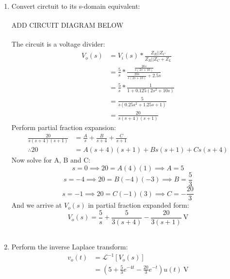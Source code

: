 \begin{enumerate}
	\item{
		Convert circtuit to its s-domain equivalent:
		\\ \\
		ADD CIRCUIT DIAGRAM BELOW
		\\ \\
		The circuit is a voltage divider:
		\begin{align*}
			V_o(s) &= V_i(s) * \frac{Z_R || Z_C}{Z_R || Z_C + Z_L} \\
			&= \frac{5}{s} * \frac{\frac{20s}{s(2s+10)}}{\frac{20s}{s(2s+10)}+2.5s} \\
			&= \frac{5}{s} * \frac{1}{1+0.125(2s^2+10s)} \\
			&= \frac{5}{s(0.25s^2+1.25s+1)} \\
			&= \frac{20}{s(s+4)(s+1)}
		\end{align*}
		Perform partial fraction expansion:
		\begin{align*}
			\frac{20}{s(s+4)(s+1)} &= \frac{A}{s} + \frac{B}{s+4} + \frac{C}{s+1} \\
			\therefore 20 &= A(s+4)(s+1) + Bs(s+1) + Cs(s+4)
		\end{align*}
		Now solve for A, B and C:
		\begin{equation*}
			s = 0 \implies 20 = A(4)(1) \implies A = 5
		\end{equation*}
		\begin{equation*}
			s = -4 \implies 20 = B(-4)(-3) \implies B = \frac{5}{3}
		\end{equation*}
		\begin{equation*}
			s = -1 \implies 20 = C(-1)(3) \implies C = -\frac{20}{3}
		\end{equation*}
		And we arrive at $V_o(s)$ in partial fraction expanded form:
		\begin{equation*}
			V_o(s) = \frac{5}{s} + \frac{5}{3(s+4)} - \frac{20}{3(s+1)} \ \mathrm{V}
		\end{equation*}
		\\
	}

	\item{
		Perform the inverse Laplace transform:
		\begin{align*}
			v_o(t) &= \mathcal{L}^{-1}\left[ V_o(s) \right] \\
			&= \left(5 + \frac{5}{3}e^{-4t} - \frac{20}{3}e^{-t} \right) u(t) \ \mathrm{V}
		\end{align*}
		\\
	}


\end{enumerate}

